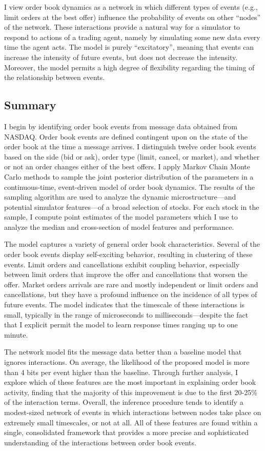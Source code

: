 	I view order book dynamics as a network in which different types of events (e.g., limit orders at the best offer) influence the probability of events on other ``nodes'' of the network. These interactions provide a natural way for a simulator to respond to actions of a trading agent, namely by simulating some new data every time the agent acts. The model is purely ``excitatory'', meaning that events can increase the intensity of future events, but does not decrease the intensity. Moreover, the model permits a high degree of flexibility regarding the timing of the relationship between events.


	\subsection{Summary}
		I begin by identifying order book events from message data obtained from NASDAQ. Order book events are defined contingent upon on the state of the order book at the time a message arrives. I distinguish twelve order book events based on the side (bid or ask), order type (limit, cancel, or market), and whether or not an order changes either of the best offers. I apply Markov Chain Monte Carlo methods to sample the joint posterior distribution of the parameters in a continuous-time, event-driven model of order book dynamics. The results of the sampling algorithm are used to analyze the dynamic microstructure---and potential simulator features---of a broad selection of stocks. For each stock in the sample, I compute point estimates of the model parameters which I use to analyze the median and cross-section of model features and performance.

		The model captures a variety of general order book characteristics. Several of the order book events display self-exciting behavior, resulting in clustering of these events. Limit orders and cancellations exhibit coupling behavior, especially between limit orders that improve the offer and cancellations that worsen the offer. Market orders arrivals are rare and mostly independent or limit orders and cancellations, but they have a profound influence on the incidence of all types of future events. The model indicates that the timescale of these interactions is small, typically in the range of microseconds to milliseconds---despite the fact that I explicit permit the model to learn response times ranging up to one minute.

		The network model fits the message data better than a baseline model that ignores interactions. On average, the likelihood of the proposed model is more than 4 bits per event higher than the baseline. Through further analysis, I explore which of these features are the most important in explaining order book activity, finding that the majority of this improvement is due to the first 20-25\% of the interaction terms. Overall, the inference procedure tends to identify a modest-sized network of events in which interactions between nodes take place on extremely small timescales, or not at all. All of these features are found within a single, consolidated framework that provides a more precise and sophisticated understanding of the interactions between order book events.

